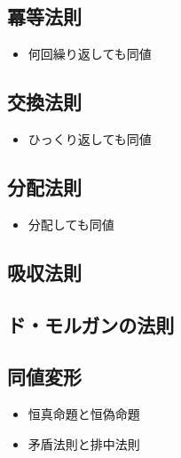\documentclass[../../imaging-math]{subfiles}
\begin{document}
\subsection{冪等法則}

\begin{mindflow}
  \begin{itemize}
    \item 何回繰り返しても同値
  \end{itemize}
\end{mindflow}

\subsection{交換法則}

\begin{mindflow}
  \begin{itemize}
    \item ひっくり返しても同値
  \end{itemize}
\end{mindflow}

\subsection{分配法則}

\begin{mindflow}
  \begin{itemize}
    \item 分配しても同値
  \end{itemize}
\end{mindflow}

\subsection{吸収法則}

\subsection{ド・モルガンの法則}

\subsection{同値変形}

\begin{mindflow}
  \begin{itemize}
    \item 恒真命題と恒偽命題
    \item 矛盾法則と排中法則
  \end{itemize}
\end{mindflow}
\end{document}
